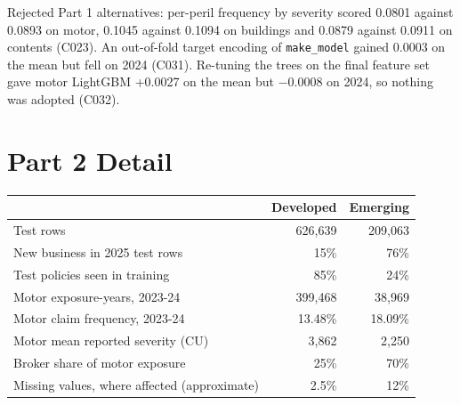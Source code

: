 \documentclass{rapport}
\begin{document}
Rejected Part 1 alternatives: per-peril frequency by severity scored 0.0801 against 0.0893 on motor, 0.1045 against
0.1094 on buildings and 0.0879 against 0.0911 on contents (C023). An out-of-fold target encoding of
\texttt{make\_model} gained 0.0003 on the mean but fell on 2024 (C031). Re-tuning the trees on the final feature set
gave motor LightGBM +0.0027 on the mean but $-0.0008$ on 2024, so nothing was adopted (C032).

\section{Part 2 Detail}
\label{ov:app-p2}

\begin{center}
\small
\begin{tabular}{lrr}
\hline
 & Developed & Emerging\\
\hline
Test rows & 626,639 & 209,063\\
New business in 2025 test rows & 15\% & 76\%\\
Test policies seen in training & 85\% & 24\%\\
Motor exposure-years, 2023-24 & 399,468 & 38,969\\
Motor claim frequency, 2023-24 & 13.48\% & 18.09\%\\
Motor mean reported severity (CU) & 3,862 & 2,250\\
Broker share of motor exposure & 25\% & 70\%\\
Missing values, where affected (approximate) & 2.5\% & 12\%\\
\hline
\end{tabular}
\end{center}
\end{document}
